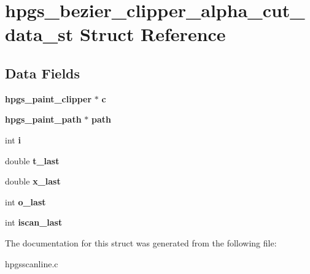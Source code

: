 \section{hpgs\_\-bezier\_\-clipper\_\-alpha\_\-cut\_\-data\_\-st Struct Reference}
\label{structhpgs__bezier__clipper__alpha__cut__data__st}
\subsection*{Data Fields}
\begin{DoxyCompactItemize}
\item 
{\bf hpgs\_\-paint\_\-clipper} $\ast$ {\bfseries c}\label{structhpgs__bezier__clipper__alpha__cut__data__st_a252665bffc5e809c512c52afdcb3f562}

\item 
{\bf hpgs\_\-paint\_\-path} $\ast$ {\bfseries path}\label{structhpgs__bezier__clipper__alpha__cut__data__st_a97e8cf64a554411d43f3a628b23bb9c9}

\item 
int {\bfseries i}\label{structhpgs__bezier__clipper__alpha__cut__data__st_a9d994f2a8affbbc9824fda1a002623d9}

\item 
double {\bfseries t\_\-last}\label{structhpgs__bezier__clipper__alpha__cut__data__st_a4e40140bec94b4ab957ed70786295b7f}

\item 
double {\bfseries x\_\-last}\label{structhpgs__bezier__clipper__alpha__cut__data__st_a67493562a22b8af8b5d9b34de76341b9}

\item 
int {\bfseries o\_\-last}\label{structhpgs__bezier__clipper__alpha__cut__data__st_a20f24d3f96065924241cb06814d33684}

\item 
int {\bfseries iscan\_\-last}\label{structhpgs__bezier__clipper__alpha__cut__data__st_a3c91bccfcc2fec2049e292170a043cc2}

\end{DoxyCompactItemize}


The documentation for this struct was generated from the following file:\begin{DoxyCompactItemize}
\item 
hpgsscanline.c\end{DoxyCompactItemize}
